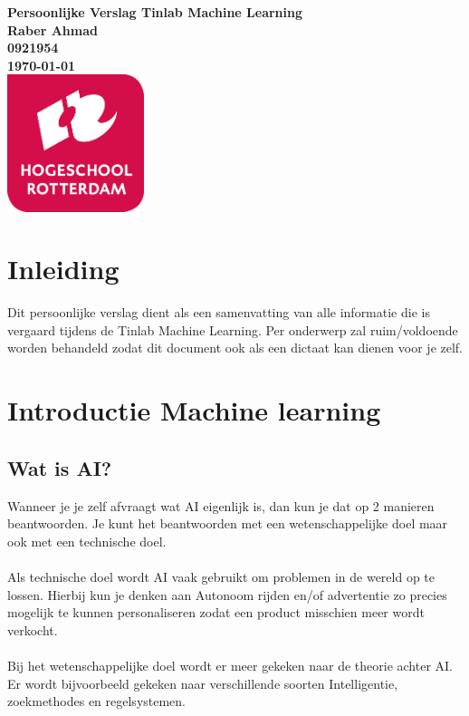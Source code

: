 \documentclass{article}
\begin{document}
\sffamily
\begin{titlepage}
  \centering
    \vfill
    {\bfseries\Huge
      Persoonlijke Verslag Tinlab Machine Learning \\
        \vskip2cm
      }
      {\bfseries\Large
        Raber Ahmad\\
      }
      {
        \bfseries\normalsize
        0921954\\
        \vskip1cm
        \today\\
    }    
    \vfill
    \includegraphics[width=4cm]{logohr.png} %
    \vfill
    \vfill
\end{titlepage}
\newpage
\tableofcontents
\newpage

\section{Inleiding}

Dit persoonlijke verslag dient als een samenvatting van alle informatie die is vergaard tijdens de Tinlab Machine Learning. Per onderwerp zal ruim/voldoende worden behandeld zodat dit document ook als een dictaat kan dienen voor je zelf.

\section{Introductie Machine learning}

\subsection{Wat is AI?}

Wanneer je je zelf afvraagt wat AI eigenlijk is, dan kun je dat op 2 manieren beantwoorden. Je kunt het beantwoorden met een wetenschappelijke doel maar ook met een technische doel. 
\\\\
Als technische doel wordt AI vaak gebruikt om problemen in de wereld op te lossen. Hierbij kun je denken aan Autonoom rijden en/of advertentie zo precies mogelijk te kunnen personaliseren zodat een product misschien meer wordt verkocht.
\\\\
Bij het wetenschappelijke doel wordt er meer gekeken naar de theorie achter AI. Er wordt bijvoorbeeld gekeken naar verschillende soorten Intelligentie, zoekmethodes en regelsystemen.
\end{document}
